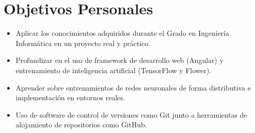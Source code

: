 \section{Objetivos Personales}
\begin{itemize}
    \item Aplicar los conocimientos adquiridos durante el Grado en Ingeniería Informática en un proyecto real y práctico.
    \item Profundizar en el uso de framework de desarrollo web (Angular) y entrenamiento de inteligencia artificial (TensorFlow y Flower).
    \item Aprender sobre entrenamientos de redes neuronales de forma distributiva e implementación en entornos reales.
    \item Uso de software de control de versiones como Git junto a herramientas de alojamiento de repositorios como GitHub.    
\end{itemize}
